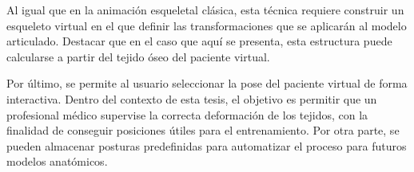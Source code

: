Al igual que en la animación esqueletal clásica, esta técnica requiere construir un esqueleto virtual en el que definir las transformaciones que se aplicarán al modelo articulado. Destacar que en el caso que aquí se presenta, esta estructura puede calcularse a partir del tejido óseo del paciente virtual.




Por último, se permite al usuario seleccionar la pose del paciente virtual de forma interactiva. Dentro del contexto de esta tesis, el objetivo es permitir que un profesional médico supervise la correcta deformación de los tejidos, con la finalidad de conseguir posiciones útiles para el entrenamiento. Por otra parte, se pueden almacenar posturas predefinidas para automatizar el proceso para futuros modelos anatómicos.





